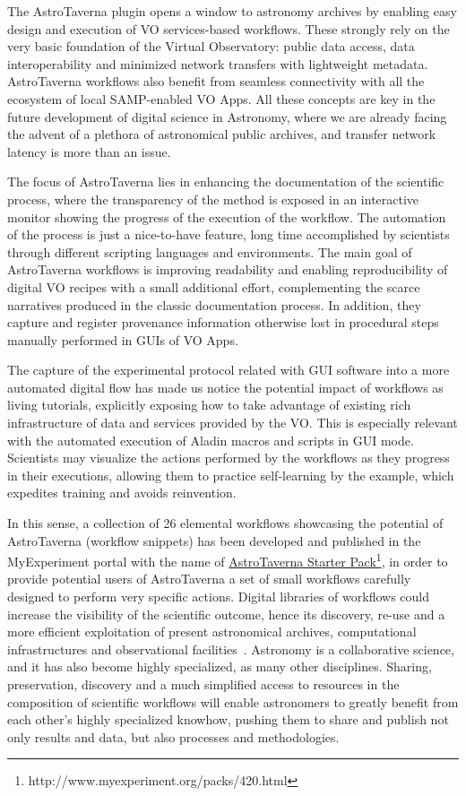 \documentclass{aa}
\begin{document}
The AstroTaverna plugin opens a window to astronomy archives by enabling easy design and execution of VO services-based workflows. These strongly rely on the very basic foundation of the Virtual Observatory: public data access, data interoperability and minimized network transfers with lightweight metadata. AstroTaverna workflows also benefit from seamless connectivity with all the ecosystem of local SAMP-enabled VO Apps. All these concepts are key in the future development of digital science in Astronomy, where we are already facing the advent of a plethora of astronomical public archives, and transfer network latency is more than an issue. 

The focus of AstroTaverna lies in enhancing the documentation of the scientific process, where the transparency of the method is exposed in an interactive monitor showing the progress of the execution of the workflow. The automation of the process is just a nice-to-have feature, long time accomplished by scientists through different scripting languages and environments. The main goal of AstroTaverna workflows is improving readability and enabling reproducibility of digital VO recipes with a small additional effort, complementing the scarce narratives produced in the classic documentation process. In addition, they capture and register provenance information otherwise lost in procedural steps manually performed in GUIs of VO Apps. 

The capture of the experimental protocol related with GUI software into a more automated digital flow has made us notice the potential impact of workflows as living tutorials, explicitly exposing how to take advantage of existing rich infrastructure of data and services provided by the VO. This is especially relevant with the automated execution of Aladin macros and scripts in GUI mode. Scientists may visualize the actions performed by the workflows as they progress in their executions, allowing them to practice self-learning by the example, which expedites training and avoids reinvention. 

In this sense, a collection of 26 elemental workflows showcasing the potential of AstroTaverna (workflow snippets) has been developed and published in the MyExperiment portal with the name of \href{http://www.myexperiment.org/packs/420.html}{AstroTaverna Starter Pack}\footnote{http://www.myexperiment.org/packs/420.html}, in order to provide potential users of AstroTaverna a set of small workflows carefully designed to perform very specific actions. Digital libraries of workflows could increase the visibility of the scientific outcome, hence its discovery, re-use and a more efficient exploitation of present astronomical archives, computational infrastructures and observational facilities~\citep{Ruiz2012}. Astronomy is a collaborative science, and it has also become highly specialized, as many other disciplines. Sharing, preservation, discovery and a much simplified access to resources in the composition of scientific workflows will enable astronomers to greatly benefit from each other’s highly specialized knowhow, pushing them to share and publish not only results and data, but also processes and methodologies.
\end{document}
